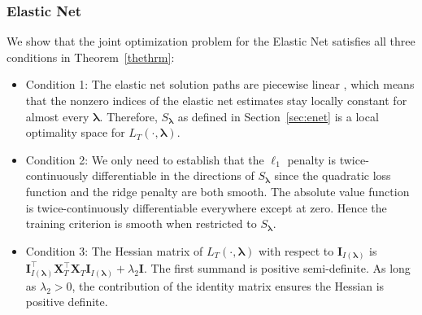 \documentclass[12pt,letterpaper]{article}
\begin{document}
\subsubsection{Elastic Net}\label{enet_conditions}
We show that the joint optimization problem for the Elastic Net satisfies all three conditions in Theorem~\ref{thethrm}:
\begin{itemize}
\item[] Condition 1: The elastic net solution paths are piecewise linear \citep{zou2003regression}, which means that the nonzero indices of the elastic net estimates stay locally constant for almost every $\boldsymbol{\lambda}$. Therefore, $S_{\boldsymbol{\lambda}}$ as defined in Section~\ref{sec:enet}  is a local optimality space for $L_T(\cdot, \boldsymbol{\lambda})$. \hfill {}
\item[] Condition 2: We only need to establish that the $\ell_1$ penalty is twice-continuously differentiable in the directions of $S_{\boldsymbol{\lambda}}$ since the quadratic loss function and the ridge penalty are both smooth. The absolute value function is twice-continuously differentiable everywhere except at zero. Hence the training criterion is smooth when restricted to $S_{\boldsymbol{\lambda}}$. \hfill {}
\item[] Condition 3: The Hessian matrix of $L_T(\cdot, \boldsymbol{\lambda})$ with respect to $\boldsymbol I_{I(\boldsymbol \lambda)}$ is $\boldsymbol I_{I(\boldsymbol \lambda)}^\top \boldsymbol{X}_{T}^\top \boldsymbol{X}_{T} \boldsymbol I_{I(\boldsymbol \lambda)} + \lambda_2 \boldsymbol{I}$. The first summand is positive semi-definite. As long as $\lambda_2 > 0$, the contribution of the identity matrix ensures the Hessian is positive definite. \hfill {}
\end{itemize}
\end{document}

